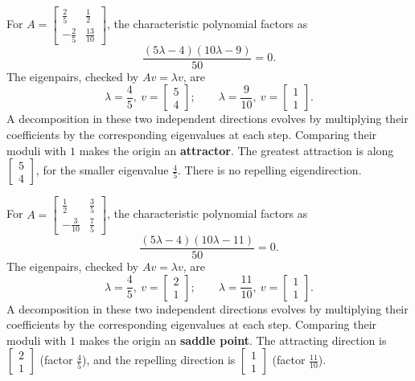 For $A=\left[\begin{matrix}\frac{2}{5} & \frac{1}{2}\\- \frac{2}{5} & \frac{13}{10}\end{matrix}\right]$, the characteristic polynomial factors as
\[\frac{\left(5 \lambda - 4\right) \left(10 \lambda - 9\right)}{50}=0.\]
The eigenpairs, checked by $Av=\lambda v$, are
\[\lambda=\frac{4}{5},\ v=\left[\begin{matrix}5\\4\end{matrix}\right];\qquad
\lambda=\frac{9}{10},\ v=\left[\begin{matrix}1\\1\end{matrix}\right].\]
A decomposition in these two independent directions evolves by
multiplying their coefficients by the corresponding eigenvalues at
each step. Comparing their moduli with $1$ makes the origin an
\textbf{attractor}. The greatest attraction is along $\left[\begin{matrix}5\\4\end{matrix}\right]$, for the smaller eigenvalue $\frac{4}{5}$. There is no repelling eigendirection.

For $A=\left[\begin{matrix}\frac{1}{2} & \frac{3}{5}\\- \frac{3}{10} & \frac{7}{5}\end{matrix}\right]$, the characteristic polynomial factors as
\[\frac{\left(5 \lambda - 4\right) \left(10 \lambda - 11\right)}{50}=0.\]
The eigenpairs, checked by $Av=\lambda v$, are
\[\lambda=\frac{4}{5},\ v=\left[\begin{matrix}2\\1\end{matrix}\right];\qquad
\lambda=\frac{11}{10},\ v=\left[\begin{matrix}1\\1\end{matrix}\right].\]
A decomposition in these two independent directions evolves by
multiplying their coefficients by the corresponding eigenvalues at
each step. Comparing their moduli with $1$ makes the origin an
\textbf{saddle point}. The attracting direction is $\left[\begin{matrix}2\\1\end{matrix}\right]$ (factor $\frac{4}{5}$), and the repelling direction is $\left[\begin{matrix}1\\1\end{matrix}\right]$ (factor $\frac{11}{10}$).

